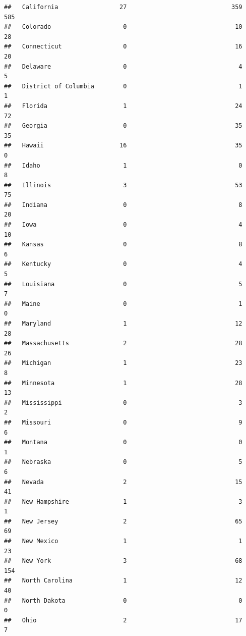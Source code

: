 \documentclass[
]{book}
\theoremstyle{definition}
\theoremstyle{definition}
\theoremstyle{definition}
\theoremstyle{remark}
\begin{document}
\begin{verbatim}
##   California                 27                             359             585
##   Colorado                    0                              10              28
##   Connecticut                 0                              16              20
##   Delaware                    0                               4               5
##   District of Columbia        0                               1               1
##   Florida                     1                              24              72
##   Georgia                     0                              35              35
##   Hawaii                     16                              35               0
##   Idaho                       1                               0               8
##   Illinois                    3                              53              75
##   Indiana                     0                               8              20
##   Iowa                        0                               4              10
##   Kansas                      0                               8               6
##   Kentucky                    0                               4               5
##   Louisiana                   0                               5               7
##   Maine                       0                               1               0
##   Maryland                    1                              12              28
##   Massachusetts               2                              28              26
##   Michigan                    1                              23               8
##   Minnesota                   1                              28              13
##   Mississippi                 0                               3               2
##   Missouri                    0                               9               6
##   Montana                     0                               0               1
##   Nebraska                    0                               5               6
##   Nevada                      2                              15              41
##   New Hampshire               1                               3               1
##   New Jersey                  2                              65              69
##   New Mexico                  1                               1              23
##   New York                    3                              68             154
##   North Carolina              1                              12              40
##   North Dakota                0                               0               0
##   Ohio                        2                              17               7

\end{verbatim}
\end{document}
